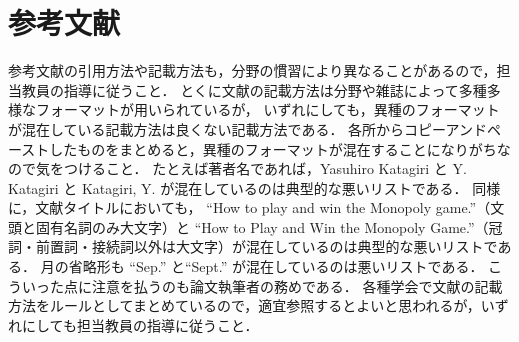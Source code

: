\section{参考文献}
参考文献の引用方法や記載方法も，分野の慣習により異なることがあるので，担当教員の指導に従うこと．
とくに文献の記載方法は分野や雑誌によって多種多様なフォーマットが用いられているが，
いずれにしても，異種のフォーマットが混在している記載方法は良くない記載方法である．
各所からコピーアンドペーストしたものをまとめると，異種のフォーマットが混在することになりがちなので気をつけること．
たとえば著者名であれば，Yasuhiro Katagiri と Y. Katagiri と Katagiri, Y. が混在しているのは典型的な悪いリストである．
同様に，文献タイトルにおいても，
``How to play and win the Monopoly game.''（文頭と固有名詞のみ大文字）と
``How to Play and Win the Monopoly Game.''（冠詞・前置詞・接続詞以外は大文字）が混在しているのは典型的な悪いリストである．
月の省略形も ``Sep.'' と``Sept.'' が混在しているのは悪いリストである．
こういった点に注意を払うのも論文執筆者の務めである．
各種学会で文献の記載方法をルールとしてまとめているので，適宜参照するとよいと思われるが，いずれにしても担当教員の指導に従うこと．


